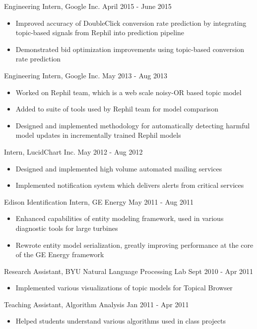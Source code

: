 \documentclass[margin]{res}
\begin{document}
\begin{resume}
Engineering Intern, Google Inc. \hfill April 2015 - June 2015
\begin{itemize} \itemsep -2pt
\item Improved accuracy of DoubleClick conversion rate prediction by integrating topic-based signals from Rephil into prediction pipeline
\item Demonstrated bid optimization improvements using topic-based conversion rate prediction
\end{itemize}

Engineering Intern, Google Inc. \hfill May 2013 - Aug 2013
\begin{itemize} \itemsep -2pt
\item Worked on Rephil team, which is a web scale noisy-OR based topic model
\item Added to suite of tools used by Rephil team for model comparison
\item Designed and implemented methodology for automatically detecting harmful model updates in incrementally trained Rephil models
\end{itemize}

Intern, LucidChart Inc. \hfill May 2012 - Aug 2012
\begin{itemize} \itemsep -2pt
\item Designed and implemented high volume automated mailing services
\item Implemented notification system which delivers alerts from critical services
\end{itemize}

Edison Identification Intern, GE Energy \hfill May 2011 - Aug 2011
\begin{itemize} \itemsep -2pt
\item Enhanced capabilities of entity modeling framework, used in various diagnostic tools for large turbines
\item Rewrote entity model serialization, greatly improving performance at the core of the GE Energy framework
\end{itemize}

Research Assistant, BYU Natural Language Processing Lab \hfill Sept 2010 - Apr
2011
\begin{itemize} \itemsep -2pt
\item Implemented various visualizations of topic models for Topical Browser
\end{itemize}

Teaching Assistant, Algorithm Analysis \hfill Jan 2011 - Apr 2011
\begin{itemize} \itemsep -2pt
\item Helped students understand various algorithms used in class projects
\end{itemize}


\end{resume}
\end{document}
